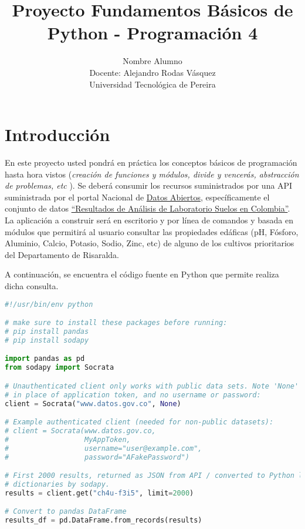 \documentclass[12pt]{article}
\begin{document}
 
 
\title{Proyecto Fundamentos Básicos de Python - Programación 4}
\author{Nombre Alumno\\ %
Docente: Alejandro Rodas Vásquez\\
Universidad Tecnológica de Pereira}

\maketitle

\section*{Introducción}
En este proyecto usted pondrá en práctica los conceptos básicos de programación hasta hora vistos (\textit{creación de funciones y módulos, divide y vencerás, abstracción de problemas, etc }). Se deberá consumir los recursos suministrados por una API suministrada por el portal Nacional de \href{https://www.datos.gov.co/}{Datos Abiertos}, específicamente el conjunto de datos \href{https://www.datos.gov.co/Agricultura-y-Desarrollo-Rural/Resultados-de-An-lisis-de-Laboratorio-Suelos-en-Co/ch4u-f3i5}{``Resultados de Análisis de Laboratorio Suelos en Colombia''}.\\


La aplicación a construir será en escritorio y por línea de comandos y basada en módulos que permitirá al usuario consultar las propiedades edáficas (pH, Fósforo, Aluminio, Calcio, Potasio, Sodio, Zinc, etc) de alguno de los cultivos prioritarios del Departamento de Risaralda.\\


\newpage



A continuación, se encuentra el código fuente en Python que permite realiza dicha consulta. 

\begin{lstlisting}[language=Python]
#!/usr/bin/env python

# make sure to install these packages before running:
# pip install pandas
# pip install sodapy

import pandas as pd
from sodapy import Socrata

# Unauthenticated client only works with public data sets. Note 'None'
# in place of application token, and no username or password:
client = Socrata("www.datos.gov.co", None)

# Example authenticated client (needed for non-public datasets):
# client = Socrata(www.datos.gov.co,
#                  MyAppToken,
#                  username="user@example.com",
#                  password="AFakePassword")

# First 2000 results, returned as JSON from API / converted to Python list of
# dictionaries by sodapy.
results = client.get("ch4u-f3i5", limit=2000)

# Convert to pandas DataFrame
results_df = pd.DataFrame.from_records(results)
\end{lstlisting}
\end{document}
